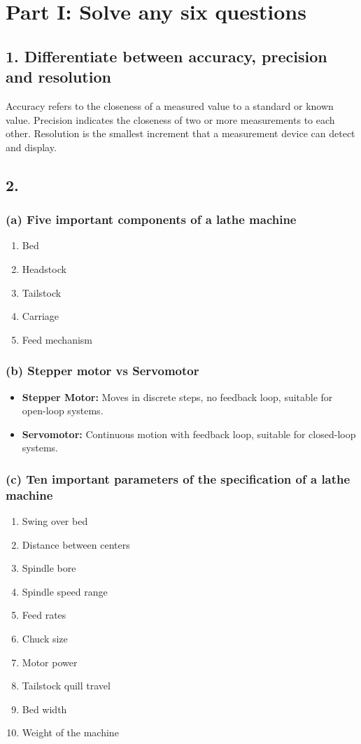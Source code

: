 \documentclass{article}
\begin{document}
\section*{Part I: Solve any six questions}

\subsection*{1. Differentiate between accuracy, precision and resolution}
Accuracy refers to the closeness of a measured value to a standard or known value. Precision indicates the closeness of two or more measurements to each other. Resolution is the smallest increment that a measurement device can detect and display.

\subsection*{2.}
\subsubsection*{(a) Five important components of a lathe machine}
\begin{enumerate}[label=\arabic*.]
    \item Bed
    \item Headstock
    \item Tailstock
    \item Carriage
    \item Feed mechanism
\end{enumerate}

\subsubsection*{(b) Stepper motor vs Servomotor}
\begin{itemize}
    \item \textbf{Stepper Motor:} Moves in discrete steps, no feedback loop, suitable for open-loop systems.
    \item \textbf{Servomotor:} Continuous motion with feedback loop, suitable for closed-loop systems.
\end{itemize}

\subsubsection*{(c) Ten important parameters of the specification of a lathe machine}
\begin{enumerate}[label=\arabic*.]
    \item Swing over bed
    \item Distance between centers
    \item Spindle bore
    \item Spindle speed range
    \item Feed rates
    \item Chuck size
    \item Motor power
    \item Tailstock quill travel
    \item Bed width
    \item Weight of the machine
\end{enumerate}
\end{document}
